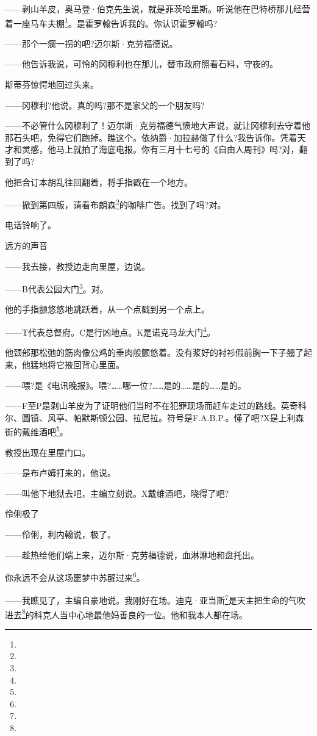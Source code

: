 \par ——剥山羊皮，奥马登·伯克先生说，就是菲茨哈里斯。听说他在巴特桥那儿经营着一座马车夫棚\footnote{}。是霍罗翰告诉我的。你认识霍罗翰吗?
\par ——那个一瘸一拐的吧?迈尔斯·克劳福德说。
\par ——他告诉我说，可怜的冈穆利也在那儿，替市政府照看石料，守夜的。
\par 斯蒂芬惊愕地回过头来。
\par ——冈穆利?他说。真的吗?那不是家父的一个朋友吗?
\par ——不必管什么冈穆利了！迈尔斯·克劳福德气愤地大声说，就让冈穆利去守着他那石头吧，免得它们跑掉。瞧这个。依纳爵·加拉赫做了什么?我告诉你。凭着天才和灵感，他马上就拍了海底电报。你有三月十七号的《自由人周刊》吗?对，翻到了吗?
\par 他把合订本胡乱往回翻着，将手指戳在一个地方。
\par ——掀到第四版，请看布朗森\footnote{}的咖啡广告。找到了吗?对。
\par 电话铃响了。
\par 远方的声音
\par ——我去接，教授边走向里屋，边说。
\par ——B代表公园大门\footnote{}。对。
\par 他的手指颤悠悠地跳跃着，从一个点戳到另一个点上。
\par ——T代表总督府。C是行凶地点。K是诺克马龙大门\footnote{}。
\par 他颈部那松弛的筋肉像公鸡的垂肉般颤悠着。没有浆好的衬衫假前胸一下子翘了起来，他猛地将它掖回背心里面。
\par ——喂?是《电讯晚报》。喂?……哪一位?……是的……是的……是的。
\par ——F至P是剥山羊皮为了证明他们当时不在犯罪现场而赶车走过的路线。英奇科尔、圆镇、风亭、帕默斯顿公园、拉尼拉。符号是F.A.B.P.。懂了吧?X是上利森街的戴维酒吧\footnote{}。
\par 教授出现在里屋门口。
\par ——是布卢姆打来的，他说。
\par ——叫他下地狱去吧，主编立刻说。X戴维酒吧，晓得了吧?
\par 伶俐极了
\par ——伶俐，利内翰说，极了。
\par ——趁热给他们端上来，迈尔斯·克劳福德说，血淋淋地和盘托出。
\par 你永远不会从这场噩梦中苏醒过来\footnote{}。
\par ——我瞧见了，主编自豪地说。我刚好在场。迪克·亚当斯\footnote{}是天主把生命的气吹进去\footnote{}的科克人当中心地最他妈善良的一位。他和我本人都在场。
